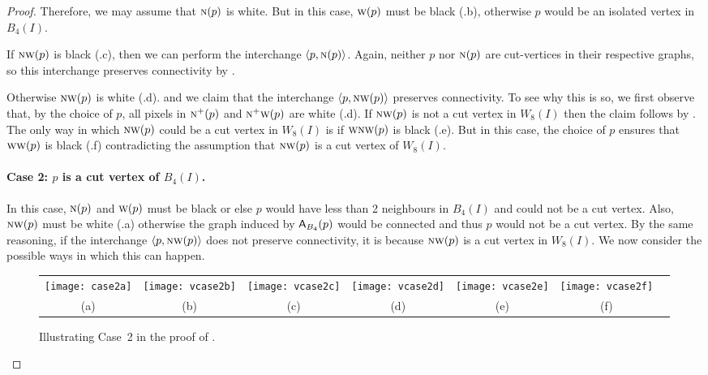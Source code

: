 \documentclass[lotsofwhite,charterfonts]{patmorin}
\newcommand{\N}{\textsc{n}}
\newcommand{\W}{\textsc{w}}
\newcommand{\NW}{\textsc{nw}}
\newcommand{\ic}[2]{\langle #1,#2 \rangle}
\newcommand{\A}[2]{\ensuremath{\protect\textup{\textsf{A}}_{#2}(#1)}}
\begin{document}
\begin{proof}
Therefore, we may assume that $\N(p)$ is white.  But in this case,
$\W(p)$ must be black (.b), otherwise $p$ would be an isolated vertex in $B_4(I)$.

If $\NW(p)$ is black (.c), then we can perform the
interchange $\ic{p}{\N(p)}$.  Again, neither $p$ nor $\N(p)$ are
cut-vertices in their respective graphs, so this interchange preserves
connectivity by .

Otherwise $\NW(p)$ is white (.d). and we claim that the
interchange $\ic{p}{\NW(p)}$ preserves connectivity. To see why this
is so, we first observe that, by the choice of $p$, all pixels in
$\N^+(p)$ and $\N^+\W(p)$ are white (.d). If $\NW(p)$
is not a cut vertex in $W_8(I)$ then the claim follows by
.  The only way in which $\NW(p)$ could be a cut
vertex in $W_8(I)$ is if $\W\NW(p)$ is black (.e). But
in this case, the choice of $p$ ensures that $\W\W(p)$ is black
(.f) contradicting the assumption that  $\NW(p)$ is a
cut vertex of $W_8(I)$.

\paragraph{Case 2: $p$ is a cut vertex of $B_4(I)$.} In this case,
$\N(p)$ and $\W(p)$ must be black or else $p$ would have less than 2
neighbours in $B_4(I)$ and could not be a cut vertex.  Also, $\NW(p)$
must be white (.a) otherwise the graph induced by
\A{p}{B_4} would be connected and thus $p$ would not be a cut vertex.
By the same reasoning, if the interchange $\ic{p}{\NW(p)}$ does not
preserve connectivity, it is because $\NW(p)$ is a cut vertex in
$W_8(I)$.  We now consider the possible ways in which this can happen.

\begin{figure}[htbp]
\begin{center}
\begin{tabular}{ccccccc}
\texttt{[image: case2a]} & 
\texttt{[image: vcase2b]} & 
\texttt{[image: vcase2c]} & 
\texttt{[image: vcase2d]} & 
\texttt{[image: vcase2e]} & 
\texttt{[image: vcase2f]} \\
(a) & (b) & (c) & (d) & (e) & (f)
\end{tabular}
\end{center}
\caption{Illustrating Case~2 in the proof of .}
\end{figure}


\end{proof}
\end{document}

